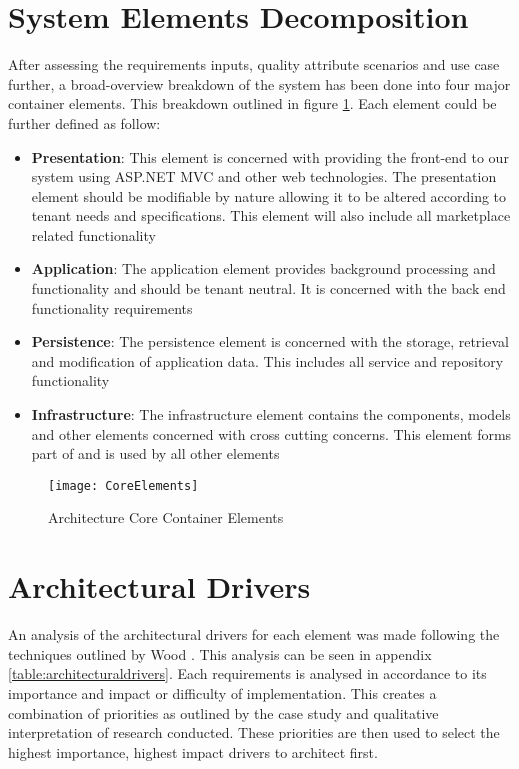 \section{System Elements Decomposition}
After assessing the requirements inputs, quality attribute scenarios and use case further, a broad-overview breakdown of the system has been done into four major container elements. This breakdown outlined in figure \ref{fig:elements}. Each element could be further defined as follow:
\begin{itemize}
\item \textbf{Presentation}: This element is concerned with providing the front-end to our system using ASP.NET MVC and other web technologies. The presentation element should be modifiable by nature allowing it to be altered according to tenant needs and specifications. This element will also include all marketplace related functionality
\item \textbf{Application}: The application element provides background processing and functionality and should be tenant neutral. It is concerned with the back end functionality requirements
\item \textbf{Persistence}: The persistence element is concerned with the storage, retrieval and modification of application data. This includes all service and repository functionality
\item \textbf{Infrastructure}: The infrastructure element contains the components, models and other elements concerned with cross cutting concerns. This element forms part of and is used by all other elements
\end{itemize}

\begin{figure}
\centering
\texttt{[image: CoreElements]}
\caption{Architecture Core Container Elements}
\label{fig:elements}
\end{figure}


\section{Architectural Drivers}
 \label{sec:arcdrivers}
An analysis of the architectural drivers for each element was made following the techniques outlined by Wood \cite{Wood2007}. This analysis can be seen in appendix \ref{table:architecturaldrivers}. Each requirements is analysed in accordance to its importance and impact or difficulty of implementation. This creates a combination of priorities as outlined by the case study and qualitative interpretation of research conducted. These priorities are then used to select the highest importance, highest impact drivers to architect first. 

